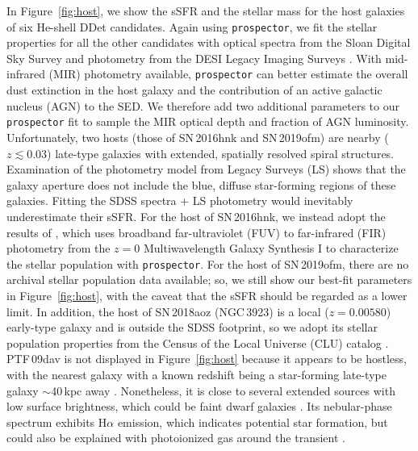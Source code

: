 \documentclass[twocolumn]{aastex631}
\begin{document}
\begin{CJK*}{UTF8}{gbsn}
In Figure~\ref{fig:host}, we show the sSFR and the stellar mass for the host galaxies of six He-shell DDet candidates. Again using \texttt{prospector}, we fit the stellar properties for all the other candidates with optical spectra from the Sloan Digital Sky Survey \citep[SDSS;][]{York_2000} and photometry from the DESI Legacy Imaging Surveys \citep[][$g$, $r$, $z$, $W_1$, $W_2$, $W_3$, $W_4$ magnitudes]{Dey_2019}. With mid-infrared (MIR) photometry available, \texttt{prospector} can better estimate the overall dust extinction in the host galaxy and the contribution of an active galactic nucleus (AGN) to the SED. We therefore add two additional parameters to our \texttt{prospector} fit to sample the MIR optical depth and fraction of AGN luminosity. Unfortunately, two hosts (those of SN\,2016hnk and SN\,2019ofm) are nearby ($z \lesssim 0.03$) late-type galaxies with extended, spatially resolved spiral structures. Examination of the photometry model from Legacy Surveys (LS) shows that the galaxy aperture does not include the blue, diffuse star-forming regions of these galaxies. Fitting the SDSS spectra + LS photometry would inevitably underestimate their sSFR. For the host of SN\,2016hnk, we instead adopt the results of \citet{Dong_Ca-rich_2022}, which uses broadband far-ultraviolet (FUV) to far-infrared (FIR) photometry from the $z=0$ Multiwavelength Galaxy Synthesis I \citep[z0MGS;][]{Leroy_2019} to characterize the stellar population with \texttt{prospector}. For the host of SN\,2019ofm, there are no archival stellar population data available; so, we still show our best-fit parameters in Figure~\ref{fig:host}, with the caveat that the sSFR should be regarded as a lower limit. In addition, the host of SN\,2018aoz (NGC\,3923) is a local ($z=0.00580$) early-type galaxy and is outside the SDSS footprint, so we adopt its stellar population properties from the Census of the Local Universe (CLU) catalog \citep{Cook_2019, de_Ca_rich_2020}. PTF\,09dav is not displayed in Figure~\ref{fig:host} because it appears to be hostless, with the nearest galaxy with a known redshift being a star-forming late-type galaxy $\sim$40\,kpc away \citep{Sullivan_2011}. Nonetheless, it is close to several extended sources with low surface brightness, which could be faint dwarf galaxies \citep[see Figure 3 in][]{Kasliwal_2012}. Its nebular-phase spectrum exhibits H$\alpha$ emission, which indicates potential star formation, but could also be explained with photoionized gas around the transient \citep{Kasliwal_2012}.


\end{CJK*}
\end{document}
